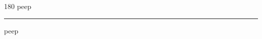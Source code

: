 
\begin{frame}
\begin{center}
\begin{turn}{180}
{\fontsize{2.5cm}{1em}\selectfont peep}
\end{turn}
\vspace{1em}\par  
\hrule
\vspace{1em}\par  
{\fontsize{2.5cm}{1em}\selectfont peep}
\end{center}
\end{frame}
